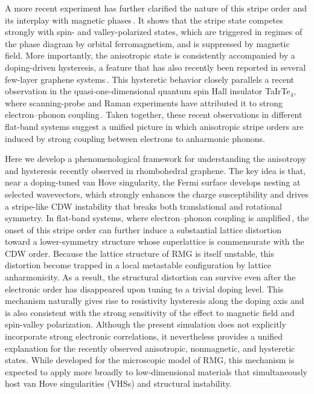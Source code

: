 \documentclass[aps,prx,article,twocolumn,amsmath,amssymb,superscriptaddress,longbibliography]{revtex4-2}
\begin{document}
A more recent experiment has further clarified the nature of this stripe order and its interplay with magnetic phases\,\cite{zhao2026hysteretical}. It shows that the stripe state competes strongly with spin- and valley-polarized states, which are triggered in regimes of the phase diagram by orbital ferromagnetism, and is suppressed by magnetic field. More importantly, the anisotropic state is consistently accompanied by a doping-driven hysteresis, a feature that has also recently been reported in several few-layer graphene systems\,\cite{zheng2023electronic, singh2026stacking}. This hysteretic behavior closely parallels a recent observation in the quasi-one-dimensional quantum spin Hall insulator TaIrTe$_4$, where scanning-probe and Raman experiments have attributed it to strong electron--phonon coupling\,\cite{tang2026bistable}. Taken together, these recent observations in different flat-band systems suggest a unified picture in which anisotropic stripe orders are induced by strong coupling between electrons to anharmonic phonons.

Here we develop a phenomenological framework for understanding the anisotropy and hysteresis recently observed in rhombohedral graphene. The key idea is that, near a doping-tuned van Hove singularity, the Fermi surface develops nesting at selected wavevectors, which strongly enhances the charge susceptibility and drives a stripe-like CDW instability that breaks both translational and rotational symmetry. In flat-band systems, where electron--phonon coupling is amplified\,\cite{wu2018theory,angeli2019epc,wu2018theory, chen2024strong,li2024evolution,birkbeck2025quantum, Liu2022moirephonon,kwan24epc,shi25epctbg,liu23epctbg,zhu26epc}, the onset of this stripe order can further induce a substantial lattice distortion toward a lower-symmetry structure whose superlattice is commensurate with the CDW order. Because the lattice structure of RMG is itself unstable, this distortion become trapped in a local metastable configuration by lattice anharmonicity. As a result, the structural distortion can survive even after the electronic order has disappeared upon tuning to a trivial doping level. This mechanism naturally gives rise to resistivity hysteresis along the doping axis and is also consistent with the strong sensitivity of the effect to magnetic field and spin-valley polarization. Although the present simulation does not explicitly incorporate strong electronic correlations, it nevertheless provides a unified explanation for the recently observed anisotropic, nonmagnetic, and hysteretic states. While developed for the microscopic model of RMG, this mechanism is expected to apply more broadly to low-dimensional materials that simultaneously host van Hove singularities (VHSs) and structural instability.
\end{document}
